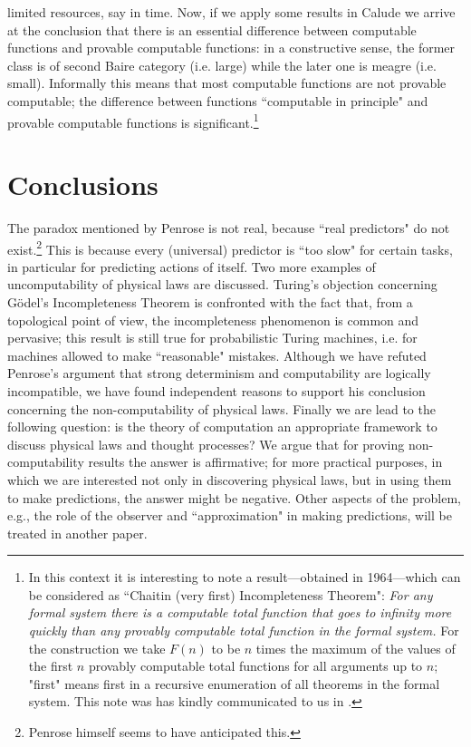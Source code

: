 limited
resources, say in time. Now, if we apply some results in Calude \cite{ca1}
we arrive at the conclusion that there is an essential
 difference between computable functions and provable computable
functions:
in a constructive sense, the former class is of second Baire category (i.e.
large)
 while the later one is meagre (i.e. small). Informally this means that
most computable
functions are not provable computable; the difference between
functions ``computable in principle" and provable computable functions
is significant.\footnote{In this context
it is interesting to  note a result---obtained in 1964---which can be
considered as
 ``Chaitin (very first) Incompleteness Theorem":
{\it For any formal system there is a computable
total function that goes to infinity more quickly than any provably
computable total function in the formal system. }   For the construction we take
$ F(n)$  to be $ n $   times the maximum of the values of the first $n$ provably
computable total functions for all arguments up to $n$;   "first" means
first in a recursive enumeration of all theorems in the formal system.
This note was has kindly communicated to us in \cite{email}.}



\section{Conclusions}
 The paradox mentioned by Penrose is not real, because ``real predictors"
do not exist.\footnote{Penrose himself seems to have anticipated this.}
This is because
every  (universal) predictor is ``too slow" for certain tasks, in particular
for predicting actions of itself. Two more examples of uncomputability
of physical laws are discussed. Turing's objection concerning
G\" odel's Incompleteness Theorem  is confronted with the
fact that,  from a topological point of view,
the incompleteness
phenomenon is common and pervasive; this result is still true
for probabilistic Turing machines, i.e. for machines allowed
to make ``reasonable" mistakes.
Although we have refuted Penrose's argument that strong determinism
and computability are logically incompatible, we have found independent
reasons to support his conclusion concerning the non-computability of physical
laws.
Finally we are lead to the following question:
is the  theory of computation
 an appropriate framework to discuss physical laws and thought processes?
We argue that for proving non-computability results the answer is affirmative;
for more practical purposes,  in  which we are interested not only in
discovering physical laws, but in using them to make predictions, the answer
might be negative.  Other aspects of the problem, e.g., the role of the
observer
and ``approximation" in making predictions, will be treated in another
paper.






